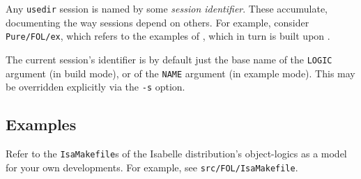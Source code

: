 \medskip Any \texttt{usedir} session is named by some \emph{session
  identifier}. These accumulate, documenting the way sessions depend on
others. For example, consider \texttt{Pure/FOL/ex}, which refers to the
examples of {\FOL}, which in turn is built upon {\Pure}.

The current session's identifier is by default just the base name of the
\texttt{LOGIC} argument (in build mode), or of the \texttt{NAME} argument (in
example mode). This may be overridden explicitly via the \texttt{-s} option.


\subsection*{Examples}

Refer to the \texttt{IsaMakefile}s of the Isabelle distribution's
object-logics as a model for your own developments.  For example, see
\texttt{src/FOL/IsaMakefile}.


